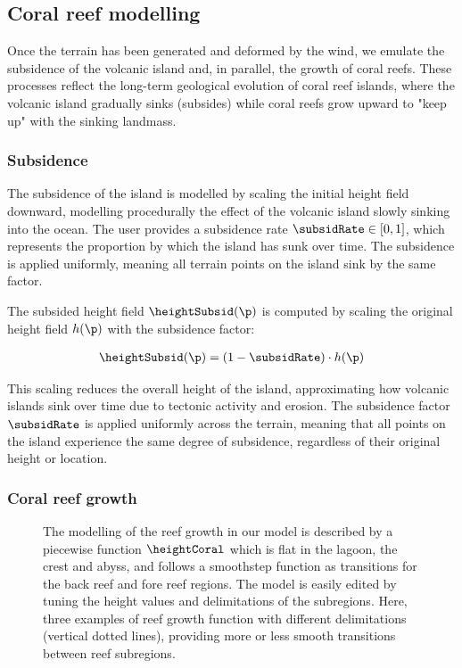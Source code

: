\subsection{Coral reef modelling}
\label{sec:coral-island-coral-reef}

Once the terrain has been generated and deformed by the wind, we emulate the subsidence of the volcanic island and, in parallel, the growth of coral reefs. These processes reflect the long-term geological evolution of coral reef islands, where the volcanic island gradually sinks (subsides) while coral reefs grow upward to "keep up" with the sinking landmass.

\subsubsection{Subsidence}
\label{sec:coral-island-subsidence}

The subsidence of the island is modelled by scaling the initial height field downward, modelling procedurally the effect of the volcanic island slowly sinking into the ocean. The user provides a subsidence rate $\subsidRate \in [0, 1]$, which represents the proportion by which the island has sunk over time. The subsidence is applied uniformly, meaning all terrain points on the island sink by the same factor.

The subsided height field $\heightSubsid(\p)$ is computed by scaling the original height field $h(\p)$ with the subsidence factor:

\begin{align}
    \heightSubsid(\p) = (1 - \subsidRate) \cdot h(\p)
\end{align}

This scaling reduces the overall height of the island, approximating how volcanic islands sink over time due to tectonic activity and erosion. The subsidence factor $\subsidRate$ is applied uniformly across the terrain, meaning that all points on the island experience the same degree of subsidence, regardless of their original height or location.

\subsubsection{Coral reef growth}
\label{sec:coral-island-reef-growth}

\begin{figure}[H]
    \caption[Coral reef growth from analytical model]{The modelling of the reef growth in our model is described by a piecewise function $\heightCoral$ which is flat in the lagoon, the crest and abyss, and follows a smoothstep function as transitions for the back reef and fore reef regions. The model is easily edited by tuning the height values and delimitations of the subregions. Here, three examples of reef growth function with different delimitations (vertical dotted lines), providing more or less smooth transitions between reef subregions.}
    \label{fig:coral-island-reef-function}
\end{figure}

